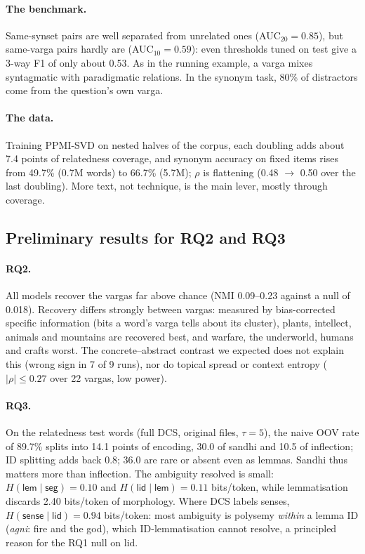 \documentclass[11pt]{article}
\newcommand{\vk}[1]{\textsf{#1}}
\begin{document}
\paragraph{The benchmark.} Same-synset pairs are well separated from
unrelated ones (AUC$_{20}=0.85$), but same-varga pairs hardly are
(AUC$_{10}=0.59$): even thresholds tuned on test give a 3-way F1 of only
about 0.53. As in the running example, a varga mixes syntagmatic with
paradigmatic relations. In the synonym task, 80\% of distractors come from
the question's own varga.
\paragraph{The data.} Training PPMI-SVD on nested halves of the corpus, each
doubling adds about 7.4 points of relatedness coverage, and synonym accuracy
on fixed items rises from 49.7\% (0.7M words) to 66.7\% (5.7M); $\rho$ is
flattening (0.48 $\to$ 0.50 over the last doubling). More text, not
technique, is the main lever, mostly through coverage.

\subsection{Preliminary results for RQ2 and RQ3}\label{sec:prelim}
\paragraph{RQ2.} All models recover the vargas far above chance (NMI
0.09--0.23 against a null of 0.018). Recovery differs strongly between
vargas: measured by bias-corrected specific information (bits a word's varga
tells about its cluster), plants, intellect, animals and mountains are
recovered best, and warfare, the underworld, humans and crafts worst. The
concrete--abstract contrast we expected does not explain this (wrong sign in
7 of 9 runs), nor do topical spread or context entropy ($|\rho|\le0.27$
over 22 vargas, low power).

\paragraph{RQ3.} On the relatedness test words (full DCS, original files,
$\tau=5$), the naive OOV rate of 89.7\% splits into 14.1 points of encoding,
30.0 of sandhi and 10.5 of inflection; ID splitting adds back 0.8; 36.0 are
rare or absent even as lemmas. Sandhi thus matters more than inflection. The
ambiguity resolved is small: $H(\vk{lem}\mid\vk{seg})=0.10$ and
$H(\vk{lid}\mid\vk{lem})=0.11$ bits/token, while lemmatisation discards 2.40
bits/token of morphology. Where DCS labels senses, $H(\vk{sense}\mid
\vk{lid})=0.94$ bits/token: most ambiguity is polysemy \emph{within} a
lemma ID (\emph{agni}: fire and the god), which ID-lemmatisation cannot
resolve, a principled reason for the RQ1 null on \vk{lid}.
\end{document}
